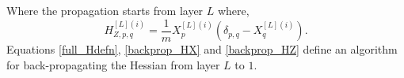 \documentclass[nohyperref]{article}
\theoremstyle{plain}
\theoremstyle{definition}
\theoremstyle{remark}
\DeclareMathOperator*{\Diag}{Diag}
\begin{document}
Where the propagation starts from layer $L$ where,
\begin{equation}
H_{Z,p,q}^{[L](i)}=\frac{1}{m} X^{[L](i)}_p\left(\delta_{p,q}-X^{[L](i)}_q \right)\label{H_Z_initial}.
\end{equation}
Equations \ref{full_Hdefn}, \ref{backprop_HX} and \ref{backprop_HZ} define an algorithm for back-propagating the Hessian from layer $L$ to $1$.
\end{document}
